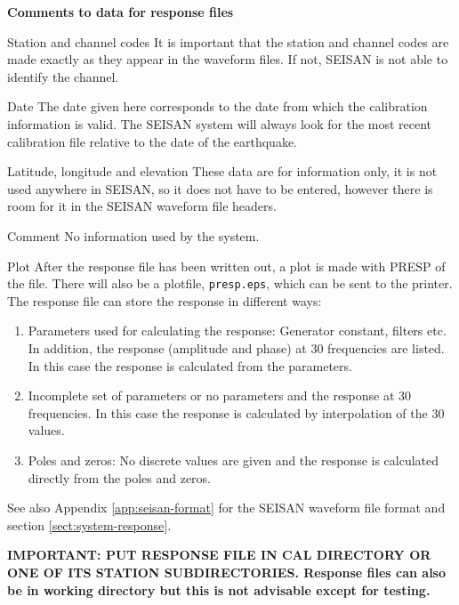 \textbf{Comments to data for response files}

Station and channel codes \newline
It is important that the station and channel codes are made exactly as they appear in the waveform files. If not, SEISAN is not able to identify the channel. 

Date \newline
The date given here corresponds to the date from which the calibration information is valid. The SEISAN system will always look for the most recent calibration file relative to the date of the earthquake. 

Latitude, longitude and elevation \newline
These data are for information only, it is not used anywhere in 
SEISAN, so it does not have to be entered, however there is room for 
it in the SEISAN waveform file headers. 

Comment \newline
No information used by the system. 

Plot \newline
After the response file has been written out, a plot is made 
with PRESP of the file. There will also be a plotfile, 
\texttt{presp.eps}, which can be sent to the printer. 
The response file can store the response in different ways: 

\begin{enumerate}
\item
Parameters used for calculating the response: Generator constant, filters etc. In addition, the response (amplitude and phase) at 30 frequencies are listed. In this case the response is calculated from the parameters. 
\item
Incomplete set of parameters or no parameters and the response at 30 frequencies. In this case the response is calculated by interpolation of the 30 values. 
\item
Poles and zeros: No discrete values are given and the response is calculated directly from the poles and zeros. 
\end{enumerate}

See also Appendix \ref{app:seisan-format} for the SEISAN 
waveform file format and section \ref{sect:system-response}. 

\textbf{IMPORTANT: PUT RESPONSE FILE IN CAL DIRECTORY OR ONE OF ITS STATION SUBDIRECTORIES. Response files can also be in working directory but this is not advisable except for testing.}


